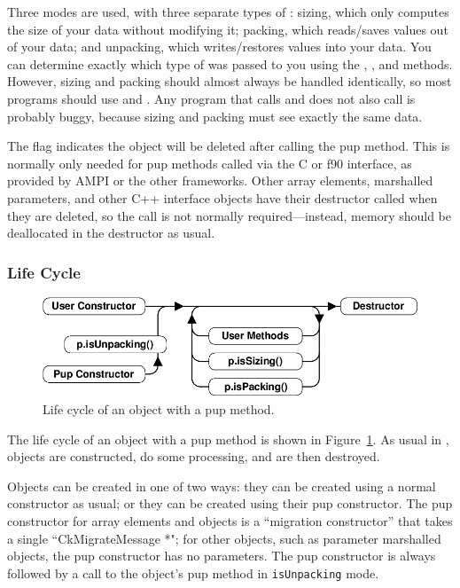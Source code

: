 Three modes are used, with three separate types of : 
sizing, which only computes the size of your data without modifying it;
packing, which reads/saves values out of your data; and unpacking,
which writes/restores values into your data.  You can determine
exactly which type of  was passed to you using the
, , and 
methods. However, sizing and packing should almost always be 
handled identically, so most programs should use 
and .  Any program that calls  
and does not also call  is probably buggy, because
sizing and packing must see exactly the same data.


The  flag indicates the object will be deleted
after calling the pup method.  This is normally only needed for
pup methods called via the C or f90 interface, as provided by 
AMPI or the other frameworks.  Other \charmpp{} array elements, 
marshalled parameters, and other C++ interface objects 
have their destructor called when they are deleted, so the 
 call is not normally required---instead,
memory should be deallocated in the destructor as usual.


\subsubsection{Life Cycle}

\label{sec:lifecycle}

\begin{figure}[h]
\begin{center}
\includegraphics[width=6.0in]{fig/pup}
\end{center}
\caption{Life cycle of an object with a pup method.}
\label{fig:pup}
\end{figure}

The life cycle of an object with a pup method is shown in 
Figure~\ref{fig:pup}.  As usual in \CC{}, objects are 
constructed, do some processing, and are then destroyed.

Objects can be created in one of two ways: they can
be created using a normal constructor as usual; or they
can be created using their pup constructor.  The pup constructor
for \charmpp{} array elements and  objects
is a ``migration constructor'' that takes a single ``CkMigrateMessage *";
for other objects, such as parameter marshalled objects,
the pup constructor has no parameters.  The pup constructor
is always followed by a call to the object's pup method in
\verb.isUnpacking. mode.

